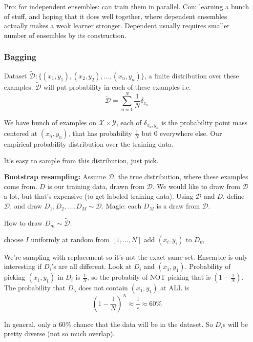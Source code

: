 Pro: for independent ensembles: can train them in parallel.
Con: learning a bunch of stuff, and hoping that it does well together,
where dependent ensembles actually makes a weak learner
stronger. Dependent usually requires smaller number of ensembles by its
construction.

\subsubsection{Bagging}
\label{sec:bagging}


Dataset $ \mathcal{\tilde D} : \{(x_1, y_1), (x_2,y_2), \dots, (x_n,y_n)\}$, a finite distribution over
  these examples. $\mathcal{\tilde D}$ will put probability in each of
  these examples i.e. $$\mathcal{\tilde  D} =
  \sum_{n=1}^N\frac{1}{N}\delta_{x_n}$$

We have bunch of examples on $\mathcal{X\times Y}$, each of
$\delta_{x_n, y_n}$ is
the probability point mass centered at $(x_n,y_n)$, that has
probability $\frac{1}{N}$ but 0 everywhere else. Our empirical
probability distribution over the training data.

It's easy to sample from this distribution, just pick. 

\textbf{Bootstrap resampling:} Assume $\mathcal{D}$, the true distribution, where these
examples come from. $D$ is our training
data, drawn from $\mathcal{D}$. We would like to draw from $\mathcal{D}$ a lot, but
that's expensive (to get labeled training data).  Using $\mathcal{D}$
and $D$, define $\mathcal{\tilde D}$, and draw $D_1, D_2, \dots, D_M
\sim \mathcal{\tilde D}$. Magic: each $D_M$ is a draw from
$\mathcal{D}$.

How to draw $D_m\sim \mathcal{\tilde D}$:
\begin{algorithmic}
     \STATE choose $I$ uniformly at random from $[1,\dots, N]$
     \STATE add $(x_i, y_i)$ to $D_m$
\ENDFOR
\end{algorithmic}

We're sampling with replacement so it's not the exact same
set. Ensemble is only interesting if $D_i$'s are all different.
Look at $D_i$ and $(x_1,y_1)$. Probability of picking $(x_1, y_1)$ in
$D_i$ is $\frac{1}{N}$, so the probabily of NOT picking that is
$(1-\frac{1}{N})$. The probability that $D_5$ does not contain $(x_1,
y_1)$ at ALL is $$(1-\frac{1}{N})^N\approx \frac{1}{e} \approx 60\%$$

In general, only a 60\% chance that the data will be in the
dataset. So $D_i$s will be pretty diverse (not so much overlap).

